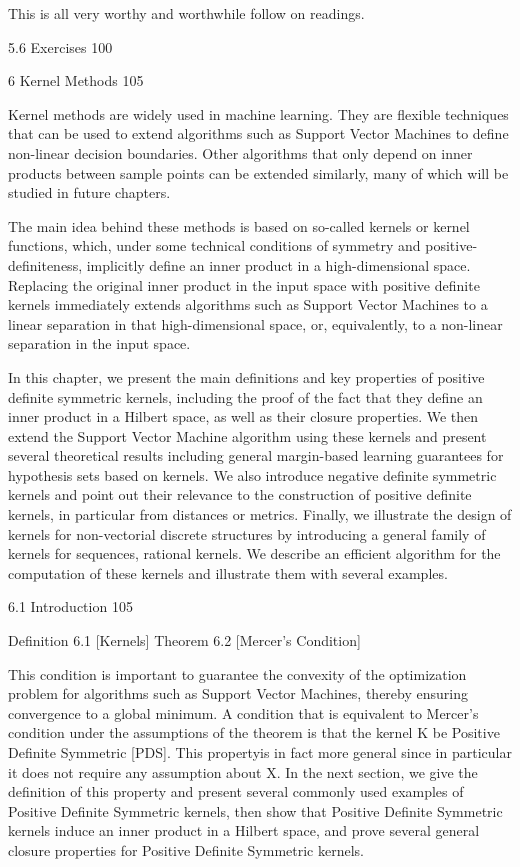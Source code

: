 This is all very worthy and worthwhile follow on readings.

5.6 Exercises 100



6 Kernel Methods 105

Kernel methods are widely used in machine learning. They are flexible techniques that can be used to extend algorithms such as Support Vector Machines to define non-linear decision boundaries. Other algorithms that only depend on inner products between sample points can be extended similarly, many of which will be studied in future chapters.

The main idea behind these methods is based on so-called kernels or kernel functions, which, under some technical conditions of symmetry and positive-definiteness, implicitly define an inner product in a high-dimensional space. Replacing the original inner product in the input space with positive definite kernels immediately extends algorithms such as Support Vector Machines to a linear separation in that high-dimensional space, or, equivalently, to a non-linear separation in the input space.

In this chapter, we present the main definitions and key properties of positive definite symmetric kernels, including the proof of the fact that they define an inner product in a Hilbert space, as well as their closure properties. We then extend the Support Vector Machine algorithm using these kernels and present several theoretical results including general margin-based learning guarantees for hypothesis sets based on kernels. We also introduce negative definite symmetric kernels and point out their relevance to the construction of positive definite kernels, in particular from distances or metrics. Finally, we illustrate the design of kernels for non-vectorial discrete structures by introducing a general family of kernels for sequences, rational kernels. We describe an efficient algorithm for the computation of these kernels and illustrate them with several examples.

6.1 Introduction 105

Definition 6.1 [Kernels]
Theorem 6.2 [Mercer's Condition]

This condition is important to guarantee the convexity of the optimization problem for algorithms such as Support Vector Machines, thereby ensuring convergence to a global minimum. A condition that is equivalent to Mercer's condition under the assumptions of the theorem is that the kernel K be Positive Definite Symmetric [PDS]. This propertyis in fact more general since in particular it does not require any assumption about X. In the next section, we give the definition of this property and present several commonly used examples of Positive Definite Symmetric kernels, then show that Positive Definite Symmetric kernels induce an inner product in a Hilbert space, and prove several general closure properties for Positive Definite Symmetric kernels.

